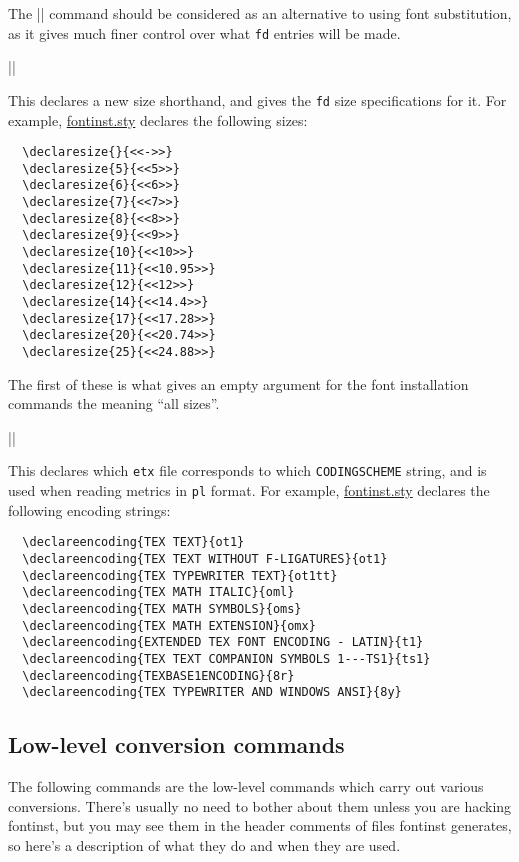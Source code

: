 \documentclass[a4paper]{ltxguide}
\newcommand*{\meta}{\m}
\newcommand*{\setfilename}[1]{\texttt{#1}}
\newcommand*{\setpackagename}[1]{\textsf{#1}}
\newcommand{\fontinst}{\setpackagename{font\-inst}\xspace}
\newcommand{\pl} {\setfilename{pl}\xspace}
\newcommand{\fd} {\setfilename{fd}\xspace}
\newcommand{\etx}{\setfilename{etx}\xspace}
\begin{document}
The |\installfontas| command should be considered as an 
alternative to using font substitution, as it gives much finer 
control over what \fd entries will be made.


\begin{decl}
  |\declaresize|
\end{decl}
This declares a new size shorthand, and gives the \fd size 
specifications for it.  For example, \url{fontinst.sty} declares 
the following sizes:
\begin{verbatim}
  \declaresize{}{<<->>}
  \declaresize{5}{<<5>>}
  \declaresize{6}{<<6>>}
  \declaresize{7}{<<7>>}
  \declaresize{8}{<<8>>}
  \declaresize{9}{<<9>>}
  \declaresize{10}{<<10>>}
  \declaresize{11}{<<10.95>>}
  \declaresize{12}{<<12>>}
  \declaresize{14}{<<14.4>>}
  \declaresize{17}{<<17.28>>}
  \declaresize{20}{<<20.74>>}
  \declaresize{25}{<<24.88>>}
\end{verbatim}
The first of these is what gives an empty \meta{size} argument for 
the font installation commands the meaning ``all sizes''.

\begin{decl}
  |\declareencoding|
\end{decl}
This declares which \etx file corresponds to which 
\texttt{CODINGSCHEME} string, and is used when reading metrics in \pl 
format.  For example, \url{fontinst.sty} declares the following
encoding strings:
\begin{verbatim}
  \declareencoding{TEX TEXT}{ot1}
  \declareencoding{TEX TEXT WITHOUT F-LIGATURES}{ot1}
  \declareencoding{TEX TYPEWRITER TEXT}{ot1tt}
  \declareencoding{TEX MATH ITALIC}{oml}
  \declareencoding{TEX MATH SYMBOLS}{oms}
  \declareencoding{TEX MATH EXTENSION}{omx}
  \declareencoding{EXTENDED TEX FONT ENCODING - LATIN}{t1}
  \declareencoding{TEX TEXT COMPANION SYMBOLS 1---TS1}{ts1}
  \declareencoding{TEXBASE1ENCODING}{8r}
  \declareencoding{TEX TYPEWRITER AND WINDOWS ANSI}{8y}
\end{verbatim}


\subsection{Low-level conversion commands}

The following commands are the low-level commands which carry out 
various conversions. There's usually no need to bother about them 
unless you are hacking \fontinst, but you may see them in the header 
comments of files \fontinst generates, so here's a description of what 
they do and when they are used.
\end{document}
